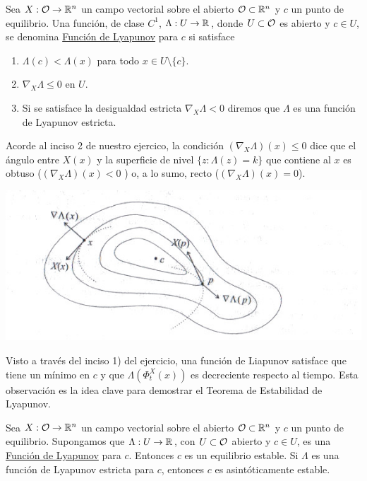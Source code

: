 \begin{definicion}
               Sea $X:\mathcal{O}\to\mathbb{R}^n$ un campo vectorial sobre el abierto $\mathcal{O}\subset\mathbb{R}^n$ y $c$ un punto de equilibrio.
               Una función, de clase $C^1$, $\Lambda:U\to\mathbb{R}$, donde $U\subset\mathcal{O}$ es  abierto y $c\in U$, se denomina
               \href{http://es.wikipedia.org/wiki/Función_de_Lyapunov}{Función de Lyapunov} para $c$ si satisface
               \begin{enumerate}
                 \item $\Lambda(c)<\Lambda(x)$ para todo $x\in U\setminus\{c\}$.
                 \item $\nabla_X\Lambda\leq 0$ en $U$.
                 \item Si se satisface la desigualdad estricta $\nabla_X\Lambda< 0$ diremos que $\Lambda$ es una 
                función de Lyapunov estricta.
               \end{enumerate}
\end{definicion}

              
  Acorde al inciso 2 de nuestro ejercico, la condición $(\nabla_X\Lambda)(x)\leq 0$ dice que el ángulo entre $X(x)$ 
 y la superficie  de nivel $\{z:\Lambda(z)=k\}$ que contiene al $x$ es obtuso ($(\nabla_X\Lambda)(x)<0$ ) 
 o, a lo sumo, recto ($(\nabla_X\Lambda)(x)=0$). 
 
   \begin{center}
   \includegraphics[scale=0.5]{imagenes/liapunov.jpg}
   \end{center}




  Visto a través del inciso 1) del ejercicio, una función de Liapunov satisface que tiene un mínimo en $c$ 
 y que $\Lambda(\Phi_t^X(x))$ es decreciente respecto al tiempo.  Esta observación es la idea clave para demostrar el Teorema de Estabilidad de Lyapunov.


\begin{teorema}
  Sea $X:\mathcal{O}\to\mathbb{R}^n$ un campo vectorial sobre el abierto $\mathcal{O}\subset\mathbb{R}^n$ y $c$ un punto de equilibrio.
               Supongamos que $\Lambda:U\to\mathbb{R}$, con $U\subset\mathcal{O}$ abierto y $c\in U$, es una
               \href{http://es.wikipedia.org/wiki/Función_de_Lyapunov}{Función de Lyapunov} para $c$. Entonces $c$ 
               es un equilibrio estable. Si $\Lambda$ es una función de Lyapunov estricta para $c$, entonces $c$ es 
               asintóticamente estable.
 \end{teorema}

